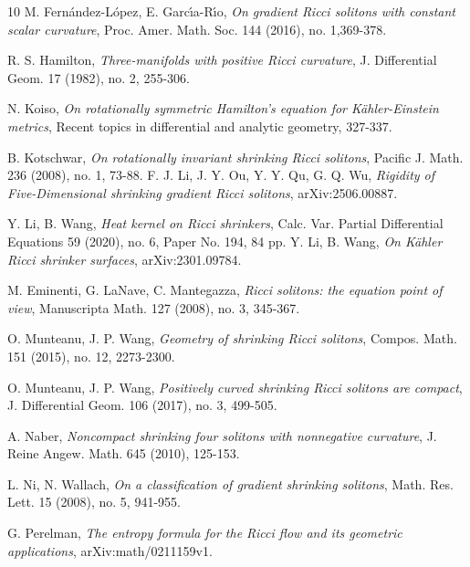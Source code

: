 \documentclass[12pt]{amsart}
\begin{document}
\begin{thebibliography}{10}
		M. Fern\'{a}ndez-L\'{o}pez, E. Garc\'{\i}a-R\'{\i}o, {\em On gradient Ricci solitons with constant scalar curvature}, Proc. Amer. Math. Soc. 144 (2016), no. 1,369-378.
		
		R. S. Hamilton, {\em Three-manifolds with positive Ricci curvature}, J. Differential Geom.  17  (1982), no. 2, 255-306.
		
		N. Koiso, {\em On rotationally symmetric Hamilton's equation for K\"ahler-Einstein metrics}, Recent topics in differential and analytic geometry, 327-337.
		
		B. Kotschwar, {\em On rotationally invariant shrinking Ricci solitons}, Pacific J. Math. 236 (2008), no. 1, 73-88.
F. J. Li, J. Y. Ou, Y. Y. Qu, G. Q. Wu, {\em Rigidity of Five-Dimensional shrinking gradient Ricci solitons}, arXiv:2506.00887.


		Y. Li, B. Wang, {\em  Heat kernel on Ricci shrinkers}, Calc. Var. Partial Differential Equations 59 (2020), no. 6, Paper No. 194, 84 pp.
		Y. Li, B. Wang,  {\em On K\"ahler Ricci shrinker surfaces}, arXiv:2301.09784.
		
		M. Eminenti, G. LaNave, C. Mantegazza,  {\em Ricci solitons: the equation point of view}, Manuscripta Math. 127 (2008), no. 3, 345-367.
		
		
		
		
		
		
		O. Munteanu, J. P. Wang, {\em Geometry of shrinking Ricci solitons}, Compos. Math. 151 (2015), no. 12, 2273-2300.
		
		O. Munteanu, J. P. Wang, {\em Positively curved shrinking Ricci solitons are compact}, J. Differential Geom. 106 (2017), no. 3, 499-505.
		
	
		
		A. Naber, {\em  Noncompact shrinking four solitons with nonnegative curvature}, J. Reine Angew. Math. 645 (2010), 125-153.
		
		L. Ni, N. Wallach, {\em On a classification of gradient shrinking solitons}, Math. Res. Lett. 15 (2008), no. 5, 941-955.
		
		G. Perelman,  {\em The entropy formula for the Ricci flow and its geometric applications}, arXiv:math/0211159v1.
		

\end{thebibliography}
\end{document}
